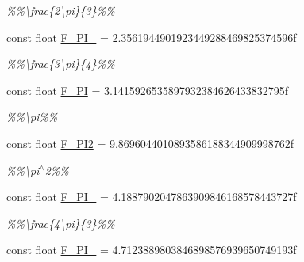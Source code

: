 \begin{DoxyCompactItemize}
\begin{DoxyCompactList}\small\item\em \%\%\textbackslash{}frac\{2\textbackslash{}pi\}\{3\}\%\% \end{DoxyCompactList}\item 
\hypertarget{group___scalar_math_consts_gadf574e6f68c342910912fe6689bcec97}{}const float \hyperlink{group___scalar_math_consts_gadf574e6f68c342910912fe6689bcec97}{F\+\_\+P\+I\+\_} = 2.\+3561944901923449288469825374596f\label{group___scalar_math_consts_gadf574e6f68c342910912fe6689bcec97}

\begin{DoxyCompactList}\small\item\em \%\%\textbackslash{}frac\{3\textbackslash{}pi\}\{4\}\%\% \end{DoxyCompactList}\item 
\hypertarget{group___scalar_math_consts_ga2c19b1c00458d0f6bd454617b337d468}{}const float \hyperlink{group___scalar_math_consts_ga2c19b1c00458d0f6bd454617b337d468}{F\+\_\+\+P\+I} = 3.\+1415926535897932384626433832795f\label{group___scalar_math_consts_ga2c19b1c00458d0f6bd454617b337d468}

\begin{DoxyCompactList}\small\item\em \%\%\textbackslash{}pi\%\% \end{DoxyCompactList}\item 
\hypertarget{group___scalar_math_consts_ga4102d0514ecc68aeb12772a49c507288}{}const float \hyperlink{group___scalar_math_consts_ga4102d0514ecc68aeb12772a49c507288}{F\+\_\+\+P\+I2} = 9.\+8696044010893586188344909998762f\label{group___scalar_math_consts_ga4102d0514ecc68aeb12772a49c507288}

\begin{DoxyCompactList}\small\item\em \%\%\textbackslash{}pi$^\wedge$2\%\% \end{DoxyCompactList}\item 
\hypertarget{group___scalar_math_consts_ga557a3cd249de463476b850a3e726f370}{}const float \hyperlink{group___scalar_math_consts_ga557a3cd249de463476b850a3e726f370}{F\+\_\+P\+I\+\_} = 4.\+1887902047863909846168578443727f\label{group___scalar_math_consts_ga557a3cd249de463476b850a3e726f370}

\begin{DoxyCompactList}\small\item\em \%\%\textbackslash{}frac\{4\textbackslash{}pi\}\{3\}\%\% \end{DoxyCompactList}\item 
\hypertarget{group___scalar_math_consts_ga868af3e091584d5352e3b00e1503a650}{}const float \hyperlink{group___scalar_math_consts_ga868af3e091584d5352e3b00e1503a650}{F\+\_\+P\+I\+\_} = 4.\+7123889803846898576939650749193f\label{group___scalar_math_consts_ga868af3e091584d5352e3b00e1503a650}


\end{DoxyCompactItemize}
